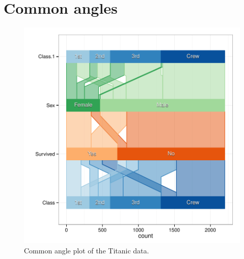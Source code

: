 %

\section{Common angles}





\begin{figure}[htbp] %
   \centering
   \includegraphics[width=\linewidth]{images/ca-titanic} 
   \caption{ \label{fig:ca-titanic} Common angle plot of the Titanic data. }
  \end{figure}

